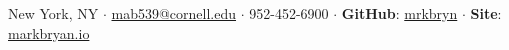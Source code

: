 {
\small \noindent
\centering
New York, NY
$\cdot$
\href{mailto:mab539@cornell.edu}{mab539@cornell.edu}
$\cdot$
952-452-6900
$\cdot$
{\bfseries\small GitHub}: \href{https://github.com/mrkbryn}{mrkbryn}
$\cdot$
{\bfseries\small Site}: \href{http://markbryan.io/}{markbryan.io}
\hfill

}
